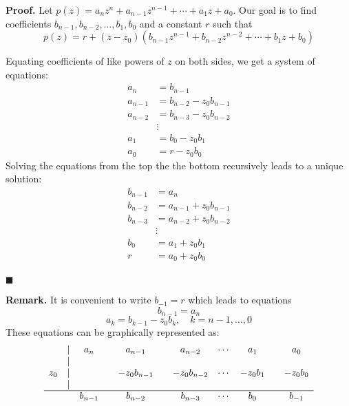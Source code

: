\documentclass[main.tex]{subfiles}
\begin{document}
\par \noindent \textbf{Proof. } Let $p(z) = a_n z^n + a_{n-1} z^{n-1} + \cdots + a_1 z + a_0$. Our goal is to find coefficients $b_{n-1}, b_{n-2}, \ldots, b_1, b_0$ and a constant $r$ such that 
\[
    p(z) = r + (z - z_0)(b_{n-1} z^{n-1} + b_{n-2} z^{n-2} + \cdots + b_1 z + b_0)
\]
\par Equating coefficients of like powers of $z$ on both sides, we get a system of equations:
\begin{align*}
    a_n &= b_{n-1} \\
    a_{n-1} &= b_{n-2} - z_0 b_{n-1} \\
    a_{n-2} &= b_{n-3} - z_0 b_{n-2} \\
    &\vdots \\
    a_1 &= b_0 - z_0 b_1 \\
    a_0 &= r - z_0 b_0
\end{align*}
Solving the equations from the top the the bottom recursively leads to a unique solution: 
\begin{align*}
    b_{n-1} &= a_n \\
    b_{n-2} &= a_{n-1} + z_0 b_{n-1} \\
    b_{n-3} &= a_{n-2} + z_0 b_{n-2} \\
    &\vdots \\
    b_0 &= a_1 + z_0 b_1 \\
    r &= a_0 + z_0 b_0
\end{align*}
\\ \null \hfill $\blacksquare$ 

\par \noindent \textbf{Remark. } It is convenient to write $b_{-1} = r$ which leads to equations 
\[
    b_{n - 1} = a_n
\]
\[
    a_k = b_{k-1} - z_0 b_k, \quad k = n-1, \ldots, 0
\]
These equations can be graphically represented as: 
\[
    \begin{array}{ccccccccccc}
        \null &  |  & a_n &     & a_{n-1} &     & a_{n-2} & \cdots & a_1 &     & a_0 \\
        \null &  |  & \null &         & \null &         &        &     & \null &     \\
        z_0&  |  &    &     & -z_0 b_{n-1} &     & -z_0 b_{n-2} & \cdots & -z_0 b_1 &     & -z_0 b_0 \\
        \null &  |  & \null &         & \null &         &        &     & \null &     \\
        \hline 
        \null &    &b_{n-1} &     & b_{n-2} &     & b_{n-3} & \cdots & b_0 &     & b_{-1} \\
    \end{array}
\]
\end{document}
